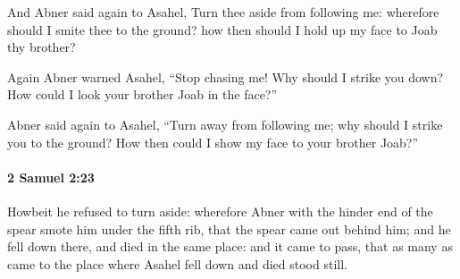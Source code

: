 			\begin{versebox}
					\item[BHS] 
					\item[ASV] And Abner said again to Asahel, Turn thee aside from following me: wherefore should I smite thee to the ground? how then should I hold up my face to Joab thy brother?
					\item[NIV] Again Abner warned Asahel, “Stop chasing me! Why should I strike you down? How could I look your brother Joab in the face?”
					\item[NRSV] Abner said again to Asahel, “Turn away from following me; why should I strike you to the ground? How then could I show my face to your brother Joab?”
			\end{versebox}

		\paragraph{2 Samuel 2:23} %
			\label{2SAMUEL-2-23}

			Howbeit he refused to turn aside: wherefore Abner with the hinder end of the spear smote him under the fifth rib, that the spear came out behind him; and he fell down there, and died in the same place: and it came to pass, that as many as came to the place where Asahel fell down and died stood still.


